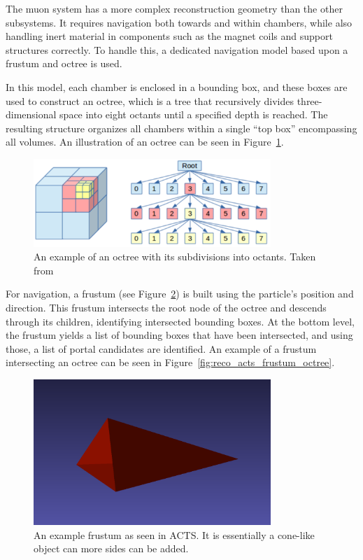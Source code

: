 The muon system has a more complex reconstruction geometry than the other subsystems. It requires navigation both towards and within chambers, while also handling inert material in components such as the magnet coils and support structures correctly. To handle this, a dedicated navigation model based upon a frustum and octree is used.

In this model, each chamber is enclosed in a bounding box, and these boxes are used to construct an octree, which is a tree that recursively divides three-dimensional space into eight octants until a specified depth is reached. The resulting structure organizes all chambers within a single “top box” encompassing all volumes. An illustration of an octree can be seen in Figure~\ref{fig:reco_acts_muon_octree}.
\begin{figure}[htp]
  \centering
  \includegraphics[width=0.8\textwidth]{figures/reco/reco_acts_muon_octree.png}
  \caption{An example of an octree with its subdivisions into octants. Taken from~\cite{geidav2014octrees}}\label{fig:reco_acts_muon_octree}
\end{figure}

For navigation, a frustum (see Figure~\ref{fig:reco_acts_frustum}) is built using the particle's position and direction. This frustum intersects the root node of the octree and descends through its children, identifying intersected bounding boxes. At the bottom level, the frustum yields a list of bounding boxes that have been intersected, and using those, a list of portal candidates are identified. An example of a frustum intersecting an octree can be seen in Figure~\ref{fig:reco_acts_frustum_octree}.

\begin{figure}[htp]
  \centering
  \includegraphics[width=0.8\textwidth]{figures/reco/reco_acts_frustum.png}
  \caption{An example frustum as seen in ACTS\@. It is essentially a cone-like object can more sides can be added.}\label{fig:reco_acts_frustum}
\end{figure}

